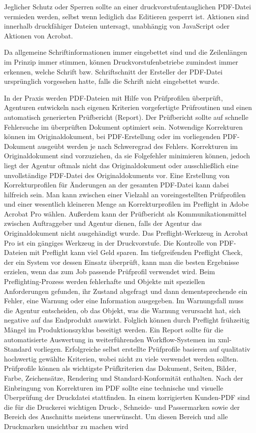 Jeglicher Schutz oder Sperren sollte an einer druckvorstufentauglichen PDF-Datei vermieden werden, selbst wenn lediglich das Editieren gesperrt ist. Aktionen sind innerhalb druckfähiger Dateien untersagt, unabhängig von JavaScript oder Aktionen von Acrobat. \cite{schneeberger}

Da allgemeine Schriftinformationen immer eingebettet sind und die Zeilenlängen im Prinzip immer stimmen, können Druckvorstufenbetriebe zumindest immer erkennen, welche Schrift bzw. Schriftschnitt der Ersteller der PDF-Datei ursprünglich vorgesehen hatte, falls die Schrift nicht eingebettet wurde. \cite{schneeberger}

In der Praxis werden PDF-Dateien mit Hilfe von Prüfprofilen überprüft, Agenturen entwickeln nach eigenen Kriterien vorgefertigte Prüfroutinen und einen automatisch generierten Prüfbericht (Report). Der Prüfbericht sollte auf schnelle Fehlersuche im überprüften Dokument optimiert sein. Notwendige Korrekturen können im Originaldokument, bei PDF-Erstellung oder im vorliegenden PDF-Dokument ausgeübt werden je nach Schweregrad des Fehlers. Korrekturen im Originaldokument sind vorzuziehen, da sie Folgefehler minimieren können, jedoch liegt der Agentur oftmals nicht das Originaldokument oder ausschließlich eine unvollständige PDF-Datei des Originaldokuments vor. Eine Erstellung von Korrekturprofilen für Änderungen an der gesamten PDF-Datei kann dabei hilfreich sein. Man kann zwischen einer Vielzahl an voreingestellten Prüfprofilen und einer wesentlich kleineren Menge an Korrekturprofilen im Preflight in Adobe Acrobat Pro wählen. Außerdem kann der Prüfbericht als Kommunikationsmittel zwischen Auftraggeber und Agentur dienen, falls der Agentur das Originaldokument nicht ausgehändigt wurde. Das Preflight-Werkzeug in Acrobat Pro ist ein gängiges Werkzeug in der Druckvorstufe. Die Kontrolle von PDF-Dateien mit Preflight kann viel Geld sparen. Im tiefgreifenden Preflight Check, der ein System vor dessen Einsatz überprüft, kann man die besten Ergebnisse erzielen, wenn das zum Job passende Prüfprofil verwendet wird. Beim Preflighting-Prozess werden fehlerhafte und Objekte mit speziellen Anforderungen gefunden, ihr Zustand abgefragt und dann dementsprechende ein Fehler, eine Warnung oder eine Information ausgegeben. Im Warnungsfall muss die Agentur entscheiden, ob das Objekt, was die Warnung verursacht hat, sich negative auf das Endprodukt auswirkt. Folglich können durch Preflight frühzeitig Mängel im Produktionszyklus beseitigt werden. Ein Report sollte für die automatisierte Auswertung in weiterführenden Workflow-Systemen im \gls{xml}-Standard vorliegen. Erfolgreiche selbst erstellte Prüfprofile basieren auf qualitativ hochwertig gewählte Kriterien, wobei nicht zu viele verwendet werden sollten. Prüfprofile können als wichtigste Prüfkriterien das Dokument, Seiten, Bilder, Farbe, Zeichensätze, Rendering und Standard-Konformität enthalten. Nach der Einbringung von Korrekturen im PDF sollte eine technische und visuelle Überprüfung der Druckdatei stattfinden. In einem korrigierten Kunden-PDF sind die für die Druckerei wichtigen Druck-, Schneide- und Passermarken sowie der Bereich des Anschnitts meistens unerwünscht. Um diesen Bereich und alle Druckmarken unsichtbar zu machen wird 